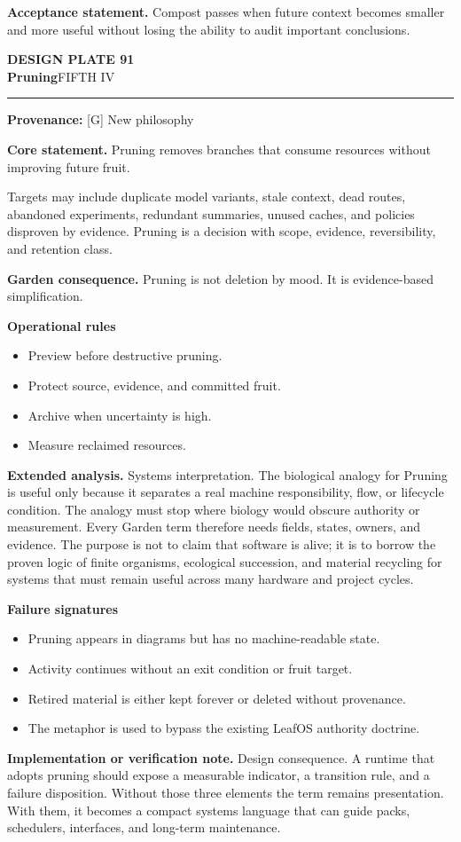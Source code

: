 \documentclass[10pt,letterpaper,oneside]{article}
\newcommand{\prov}[1]{\textcolor{gardenBlue}{\sffamily\footnotesize\textbf{Provenance:} #1}}
\newcommand{\platetitle}[3]{%
  \begin{minipage}[t][0.54in][t]{\textwidth}
  {\sffamily\bfseries\color{gardenDeep}\fontsize{9}{10}\selectfont DESIGN PLATE #1}\\[-1pt]
  {\sffamily\bfseries\color{gardenInk}\fontsize{16.5}{18}\selectfont #2}\hfill{\sffamily\color{gardenGreen}\large #3}
  \end{minipage}\vspace{-2pt}\hrule\vspace{5pt}}
\begin{document}
\begin{acceptbox}
\textbf{Acceptance statement.} Compost passes when future context becomes smaller and more useful without losing the ability to audit important conclusions.
\end{acceptbox}
\newpage
\platetitle{91}{Pruning}{FIFTH IV}
\prov{[G] New philosophy}
\fontsize{8.85}{10.45}\selectfont
\begin{corebox}
\textbf{Core statement.} Pruning removes branches that consume resources without improving future fruit.
\end{corebox}
Targets may include duplicate model variants, stale context, dead routes, abandoned experiments, redundant summaries, unused caches, and policies disproven by evidence. Pruning is a decision with scope, evidence, reversibility, and retention class.

\textbf{Garden consequence.} Pruning is not deletion by mood. It is evidence-based simplification.

\textbf{Operational rules}
\begin{itemize}
\item Preview before destructive pruning.
\item Protect source, evidence, and committed fruit.
\item Archive when uncertainty is high.
\item Measure reclaimed resources.
\end{itemize}
\textbf{Extended analysis.} Systems interpretation. The biological analogy for Pruning is useful only because it separates a real machine responsibility, flow, or lifecycle condition. The analogy must stop where biology would obscure authority or measurement. Every Garden term therefore needs fields, states, owners, and evidence. The purpose is not to claim that software is alive; it is to borrow the proven logic of finite organisms, ecological succession, and material recycling for systems that must remain useful across many hardware and project cycles.

\textbf{Failure signatures}
\begin{itemize}
\item Pruning appears in diagrams but has no machine-readable state.
\item Activity continues without an exit condition or fruit target.
\item Retired material is either kept forever or deleted without provenance.
\item The metaphor is used to bypass the existing LeafOS authority doctrine.
\end{itemize}
\textbf{Implementation or verification note.} Design consequence. A runtime that adopts pruning should expose a measurable indicator, a transition rule, and a failure disposition. Without those three elements the term remains presentation. With them, it becomes a compact systems language that can guide packs, schedulers, interfaces, and long-term maintenance.
\end{document}
